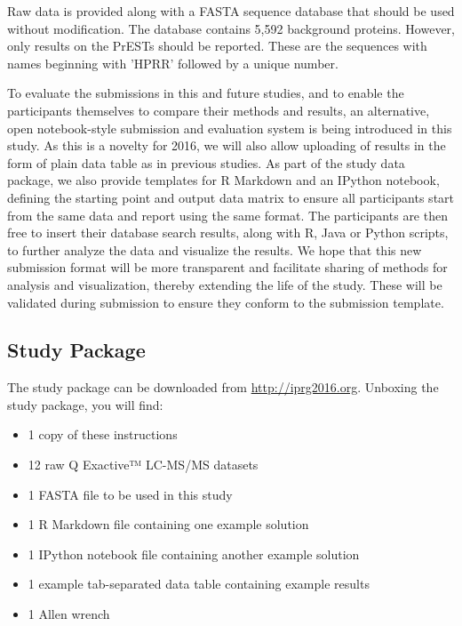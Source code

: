 \documentclass[a4paper,12pt]{article}
\begin{document}
Raw data is provided along with a FASTA sequence database that should be used without modification. The database contains 5,592 background proteins. However, only results on the PrESTs should be reported. These are the sequences with names beginning with 'HPRR' followed by a unique number.

To evaluate the submissions in this and future studies, and to enable the participants themselves to compare their methods and results, an alternative, open notebook-style submission and evaluation system is being introduced in this study. As this is a novelty for 2016, we will also allow uploading of results in the form of plain data table as in previous studies. As part of the study data package, we also provide templates for R Markdown and an IPython notebook, defining the starting point and output data matrix to ensure all participants start from the same data and report using the same format. The participants are then free to insert their database search results, along with R, Java or Python scripts, to further analyze the data and visualize the results. We hope that this new submission format will be more transparent and facilitate sharing of methods for analysis and visualization, thereby extending the life of the study. These will be validated during submission to ensure they conform to the submission template.

\subsection*{Study Package}
The study package can be downloaded from \url{http://iprg2016.org}. Unboxing the study package, you will find:
\begin{itemize}
\item1 copy of these instructions
\item12 raw Q Exactive™ LC-MS/MS datasets
\item1 FASTA file to be used in this study
\item1 R Markdown file containing one example solution
\item1 IPython notebook file containing another example solution
\item1 example tab-separated data table containing example results
\item1 Allen wrench
\end{itemize}
\end{document}
